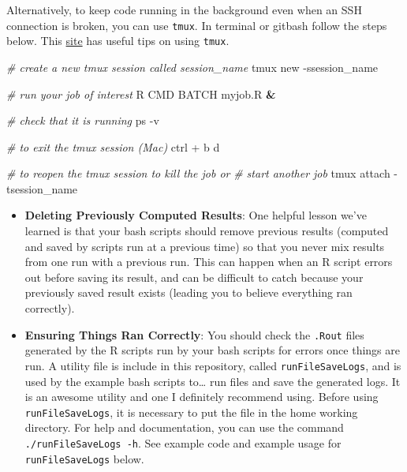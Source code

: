 \documentclass[
]{book}
\newenvironment{Shaded}{\begin{snugshade}}{\end{snugshade}}
\newcommand{\AttributeTok}[1]{\textcolor[rgb]{0.77,0.63,0.00}{#1}}
\newcommand{\CommentTok}[1]{\textcolor[rgb]{0.56,0.35,0.01}{\textit{#1}}}
\newcommand{\ExtensionTok}[1]{#1}
\newcommand{\FunctionTok}[1]{\textcolor[rgb]{0.00,0.00,0.00}{#1}}
\newcommand{\KeywordTok}[1]{\textcolor[rgb]{0.13,0.29,0.53}{\textbf{#1}}}
\newcommand{\NormalTok}[1]{#1}
\begin{document}
Alternatively, to keep code running in the background even when an SSH connection is broken, you can use \texttt{tmux}. In terminal or gitbash follow the steps below. This \href{https://medium.com/@jeongwhanchoi/install-tmux-on-osx-and-basics-commands-for-beginners-be22520fd95e}{site} has useful tips on using \texttt{tmux}.

\begin{Shaded}
\begin{Highlighting}[]
\CommentTok{\# create a new tmux session called session\_name}
\ExtensionTok{tmux}\NormalTok{ new }\AttributeTok{{-}ssession\_name}

\CommentTok{\# run your job of interest}
\ExtensionTok{R}\NormalTok{ CMD BATCH myjob.R }\KeywordTok{\&} 
  
\CommentTok{\# check that it is running}
\FunctionTok{ps} \AttributeTok{{-}v}

\CommentTok{\# to exit the tmux session (Mac)}
\ExtensionTok{ctrl}\NormalTok{ + b }
\ExtensionTok{d}

\CommentTok{\# to reopen the tmux session to kill the job or }
\CommentTok{\# start another job}
\ExtensionTok{tmux}\NormalTok{ attach }\AttributeTok{{-}tsession\_name} 
\end{Highlighting}
\end{Shaded}

\begin{itemize}
\item
  \textbf{Deleting Previously Computed Results}: One helpful lesson we've learned is that your bash scripts should remove previous results (computed and saved by scripts run at a previous time) so that you never mix results from one run with a previous run. This can happen when an R script errors out before saving its result, and can be difficult to catch because your previously saved result exists (leading you to believe everything ran correctly).
\item
  \textbf{Ensuring Things Ran Correctly}: You should check the \texttt{.Rout} files generated by the R scripts run by your bash scripts for errors once things are run. A utility file is include in this repository, called \texttt{runFileSaveLogs}, and is used by the example bash scripts to\ldots{} run files and save the generated logs. It is an awesome utility and one I definitely recommend using. Before using \texttt{runFileSaveLogs}, it is necessary to put the file in the home working directory. For help and documentation, you can use the command \texttt{./runFileSaveLogs\ -h}. See example code and example usage for \texttt{runFileSaveLogs} below.
\end{itemize}
\end{document}
